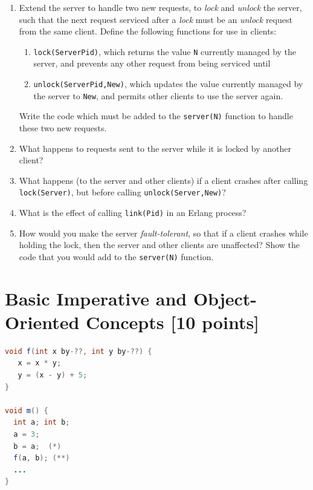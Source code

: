 \documentclass{article}
\begin{document}
\begin{enumerate}
\item
Extend the server to handle two new requests, to {\em lock} and {\em
  unlock} the server, such that the next request serviced after a {\em
  lock} must be an {\em unlock} request from the same client. Define
the following functions for use in clients:
\begin{enumerate}
\item
\verb!lock(ServerPid)!, which returns the value \verb!N! currently
managed by the server, and prevents any other request from being
serviced until
\item
\verb!unlock(ServerPid,New)!, which updates the value currently
managed by the server to \verb!New!, and permits other clients to use
the server again.
\end{enumerate}
Write the code which must be added to the \verb!server(N)! function to
handle these two new requests.
\item
What happens to requests sent to the server while it is locked by
another client?
\item
What happens (to the server and other clients) if a client crashes
after calling \verb!lock(Server)!, but before calling
\verb!unlock(Server,New)!?
\item
What is the effect of calling \verb!link(Pid)! in an Erlang process?
\item
How would you make the server {\em fault-tolerant}, so that if a
client crashes while holding the lock, then the server and other
clients are unaffected?  Show the code that you would add to the
\verb!server(N)! function.  


\end{enumerate}


\newpage




\newpage

\section{Basic Imperative and Object-Oriented Concepts [10 points]}

\begin{center}
\begin{lstlisting}[language=Java, title=- Listing 3.1 - , columns=flexible, basicstyle=\small]
void f(int x by-??, int y by-??) {
   x = x * y;
   y = (x - y) + 5;
}

void m() {
  int a; int b;
  a = 3;
  b = a;  (*)
  f(a, b); (**)
  ...
}
\end{lstlisting}
\end{center}
\end{document}
